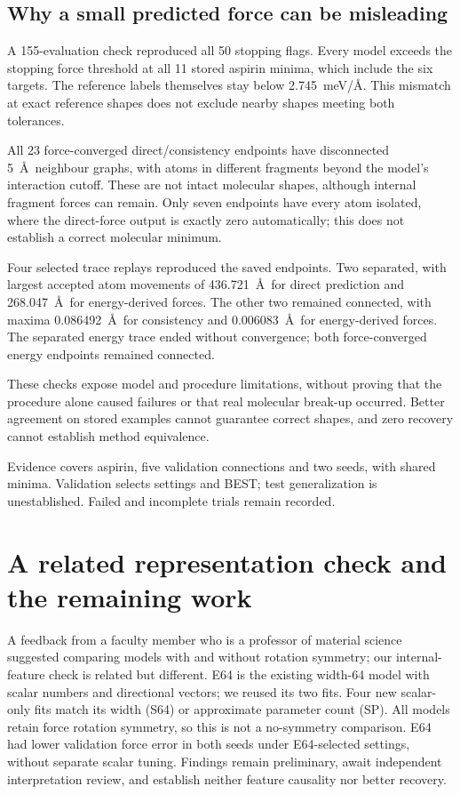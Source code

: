 \documentclass{article}
\begin{document}
\subsection{Why a small predicted force can be misleading}
A 155-evaluation check reproduced all 50 stopping flags. Every model exceeds the stopping force threshold at all 11 stored aspirin minima, which include the six targets. The reference labels themselves stay below 2.745~meV/\AA. This mismatch at exact reference shapes does not exclude nearby shapes meeting both tolerances.

All 23 force-converged direct/consistency endpoints have disconnected 5~\AA\ neighbour graphs, with atoms in different fragments beyond the model's interaction cutoff. These are not intact molecular shapes, although internal fragment forces can remain. Only seven endpoints have every atom isolated, where the direct-force output is exactly zero automatically; this does not establish a correct molecular minimum.

Four selected trace replays reproduced the saved endpoints. Two separated, with largest accepted atom movements of 436.721~\AA\ for direct prediction and 268.047~\AA\ for energy-derived forces. The other two remained connected, with maxima 0.086492~\AA\ for consistency and 0.006083~\AA\ for energy-derived forces. The separated energy trace ended without convergence; both force-converged energy endpoints remained connected.

These checks expose model and procedure limitations, without proving that the procedure alone caused failures or that real molecular break-up occurred. Better agreement on stored examples cannot guarantee correct shapes, and zero recovery cannot establish method equivalence.

Evidence covers aspirin, five validation connections and two seeds, with shared minima. Validation selects settings and BEST; test generalization is unestablished. Failed and incomplete trials remain recorded.

\section{A related representation check and the remaining work}
A feedback from a faculty member who is a professor of material science suggested comparing models with and without rotation symmetry; our internal-feature check is related but different. E64 is the existing width-64 model with scalar numbers and directional vectors; we reused its two fits. Four new scalar-only fits match its width (S64) or approximate parameter count (SP). All models retain force rotation symmetry, so this is not a no-symmetry comparison. E64 had lower validation force error in both seeds under E64-selected settings, without separate scalar tuning. Findings remain preliminary, await independent interpretation review, and establish neither feature causality nor better recovery.
\end{document}
